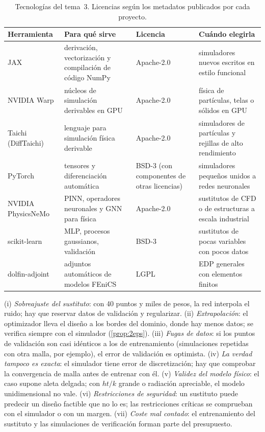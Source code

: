 \begin{table}[h]
\centering\small
\begin{tabularx}{\textwidth}{@{}l>{\raggedright\arraybackslash}X>{\raggedright\arraybackslash}p{2.3cm}>{\raggedright\arraybackslash}X@{}}
\toprule
Herramienta & Para qué sirve & Licencia & Cuándo elegirla \\
\midrule
JAX & derivación, vectorización y compilación de código NumPy & Apache-2.0 & simuladores nuevos escritos en estilo funcional \\
NVIDIA Warp & núcleos de simulación derivables en GPU & Apache-2.0 & física de partículas, telas o sólidos en GPU \\
Taichi (DiffTaichi) & lenguaje para simulación física derivable & Apache-2.0 & simuladores de partículas y rejillas de alto rendimiento \\
PyTorch & tensores y diferenciación automática & BSD-3 (con componentes de otras licencias) & simuladores pequeños unidos a redes neuronales \\
NVIDIA PhysicsNeMo & PINN, operadores neuronales y GNN para física & Apache-2.0 & sustitutos de CFD o de estructuras a escala industrial \\
scikit-learn & MLP, procesos gaussianos, validación & BSD-3 & sustitutos de pocas variables con pocos datos \\
dolfin-adjoint & adjuntos automáticos de modelos FEniCS & LGPL & EDP generales con elementos finitos \\
\bottomrule
\end{tabularx}
\caption{Tecnologías del tema~3. Licencias según los metadatos publicados por cada proyecto.}
\label{tab:tec3}
\end{table}

\begin{observacion}\label{obs:errores3}
(i) \emph{Sobreajuste del sustituto}: con 40 puntos y miles de pesos, la red interpola el ruido; hay que reservar datos de validación y regularizar. (ii) \emph{Extrapolación}: el optimizador lleva el diseño a los bordes del dominio, donde hay menos datos; se verifica siempre con el simulador (\cref{prop:2eps}). (iii) \emph{Fugas de datos}: si los puntos de validación son casi idénticos a los de entrenamiento (simulaciones repetidas con otra malla, por ejemplo), el error de validación es optimista. (iv) \emph{La verdad tampoco es exacta}: el simulador tiene error de discretización; hay que comprobar la convergencia de malla antes de entrenar con él. (v) \emph{Validez del modelo físico}: el caso supone aleta delgada; con $ht/k$ grande o radiación apreciable, el modelo unidimensional no vale. (vi) \emph{Restricciones de seguridad}: un sustituto puede predecir un diseño factible que no lo es; las restricciones críticas se comprueban con el simulador o con un margen. (vii) \emph{Coste mal contado}: el entrenamiento del sustituto y las simulaciones de verificación forman parte del presupuesto.
\end{observacion}

